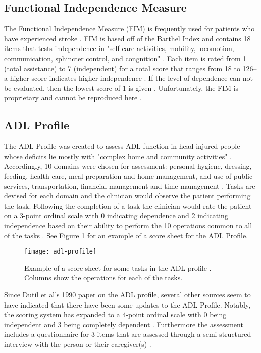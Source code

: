 \clearpage
\subsection{Functional Independence Measure}
The Functional Independence Measure (FIM) is frequently used for patients who have experienced stroke \cite{davidson_functional_2014}. FIM is based off of the Barthel Index and contains 18 items that tests independence in "self-care activities, mobility, locomotion, communication, sphincter control, and congnition" \cite{davidson_functional_2014}. Each item is rated from 1 (total assistance) to 7 (independent) for a total score that ranges from 18 to 126--a higher score indicates higher independence \cite{davidson_functional_2014}. If the level of dependence can not be evaluated, then the lowest score of 1 is given \cite{davidson_functional_2014}. Unfortunately, the FIM is proprietary and cannot be reproduced here \cite{noauthor_fimtm_nodate}. 

\clearpage
\subsection{ADL Profile}
The ADL Profile was created to assess ADL function in head injured people whose deficits lie mostly with "complex home and community activities" \cite{dutil_development_1990}. Accordingly, 10 domains were chosen for assessment: personal hygiene, dressing, feeding, health care, meal preparation and home management, and use of public services, transportation, financial management and time management \cite{dutil_development_1990}. Tasks are devised for each domain and the clinician would observe the patient performing the task. Following the completion of a task the clinician would rate the patient on a 3-point ordinal scale with 0 indicating dependence and 2 indicating independence based on their ability to perform the 10 operations common to all of the tasks \cite{dutil_development_1990}. See Figure \ref{fig:adl-profile} for an example of a score sheet for the ADL Profile.

\begin{figure}[ht]
    \centering
    \texttt{[image: adl-profile]}
    \caption{Example of a score sheet for some tasks in the ADL profile \cite{dutil_development_1990}. Columns show the operations for each of the tasks.}
    \label{fig:adl-profile}
\end{figure}

Since Dutil et al's 1990 paper on the ADL profile, several other sources seem to have indicated that there have been some updates to the ADL Profile. Notably, the scoring system has expanded to a 4-point ordinal scale with 0 being independent and 3 being completely dependent \cite{pashmdarfard_assessment_2020,bottari_iadl_2010}. Furthermore the assessment includes a questionnaire for 3 items that are assessed through a semi-structured interview with the person or their caregiver(s) \cite{pashmdarfard_assessment_2020,bottari_iadl_2010}.  

